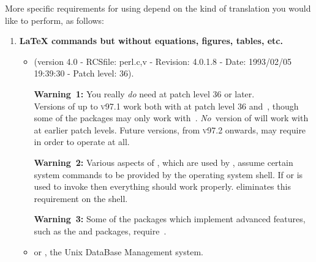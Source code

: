 \medskip\htmlrule
\medskip\noindent
More specific requirements for using \latextohtml{}
depend on the kind of translation you would like to perform, as follows:
%
\begin{enumerate}
\item
{}%
\textbf{\LaTeX{}  commands but without equations, figures, tables, etc.} \hfill
\begin{itemize}
\item
{}
\begin{small}
(version 4.0 - RCSfile: perl.c,v - Revision: 4.0.1.8 - Date:
1993/02/05 19:39:30 - Patch level: 36).
\end{small}\html{\smallskip}

\textbf{Warning~1: }%
You really \emph{do} need \Perl{} at patch level 36 or later.\\
Versions of \latextohtml{} up to \textsc{v97.1} work
both with  at patch level 36 and \,,
though some of the packages may only work with \,.\html{\\}
\emph{No}~version
of \latextohtml{} will work  with  at earlier patch levels.\html{\\}
Future versions, from \textsc{v97.2} onwards,
may require  in order to operate at all.


\textbf{Warning~2: }%
Various aspects of \Perl{}, which are used by \latextohtml{}, assume
certain system commands to be provided by the operating system shell.
If  or  is used to invoke \latextohtml{}
then everything should work properly.
 eliminates this requirement on the shell.

\textbf{Warning~3: }%
Some of the packages which implement advanced features,
such as the  and  packages,
require \,.

%
\item
{} or , the Unix DataBase Management system.
\end{itemize}


\end{enumerate}
